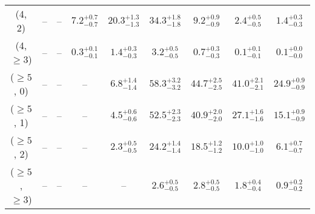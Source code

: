\begin{table}[h!]
{\begin{tabular}{ccccccccc}
	(4, 2) & -- & -- & $7.2^{+ 0.7 }_{- 0.7 }$ & $20.3^{+ 1.3 }_{- 1.3 }$ & $34.3^{+ 1.8 }_{- 1.8 }$ & $9.2^{+ 0.9 }_{- 0.9 }$ & $2.4^{+ 0.5 }_{- 0.5 }$ & $1.4^{+ 0.3 }_{- 0.3 }$ \\[0.5ex] 
	(4, $\ge3$) & -- & -- & $0.3^{+ 0.1 }_{- 0.1 }$ & $1.4^{+ 0.3 }_{- 0.3 }$ & $3.2^{+ 0.5 }_{- 0.5 }$ & $0.7^{+ 0.3 }_{- 0.3 }$ & $0.1^{+ 0.1 }_{- 0.1 }$ & $0.1^{+ 0.0 }_{- 0.0 }$ \\[0.5ex] 
	($\ge5$, 0) & -- & -- & -- & $6.8^{+ 1.4 }_{- 1.4 }$ & $58.3^{+ 3.2 }_{- 3.2 }$ & $44.7^{+ 2.5 }_{- 2.5 }$ & $41.0^{+ 2.1 }_{- 2.1 }$ & $24.9^{+ 0.9 }_{- 0.9 }$ \\[0.5ex] 
	($\ge5$, 1) & -- & -- & -- & $4.5^{+ 0.6 }_{- 0.6 }$ & $52.5^{+ 2.3 }_{- 2.3 }$ & $40.9^{+ 2.0 }_{- 2.0 }$ & $27.1^{+ 1.6 }_{- 1.6 }$ & $15.1^{+ 0.9 }_{- 0.9 }$ \\[0.5ex] 
	($\ge5$, 2) & -- & -- & -- & $2.3^{+ 0.5 }_{- 0.5 }$ & $24.2^{+ 1.4 }_{- 1.4 }$ & $18.5^{+ 1.2 }_{- 1.2 }$ & $10.0^{+ 1.0 }_{- 1.0 }$ & $6.1^{+ 0.7 }_{- 0.7 }$ \\[0.5ex] 
	($\ge5$, $\ge3$) & -- & -- & -- & -- & $2.6^{+ 0.5 }_{- 0.5 }$ & $2.8^{+ 0.5 }_{- 0.5 }$ & $1.8^{+ 0.4 }_{- 0.4 }$ & $0.9^{+ 0.2 }_{- 0.2 }$ \\[0.5ex] 
	\hline
	\hline
\end{tabular}}
\end{table}
